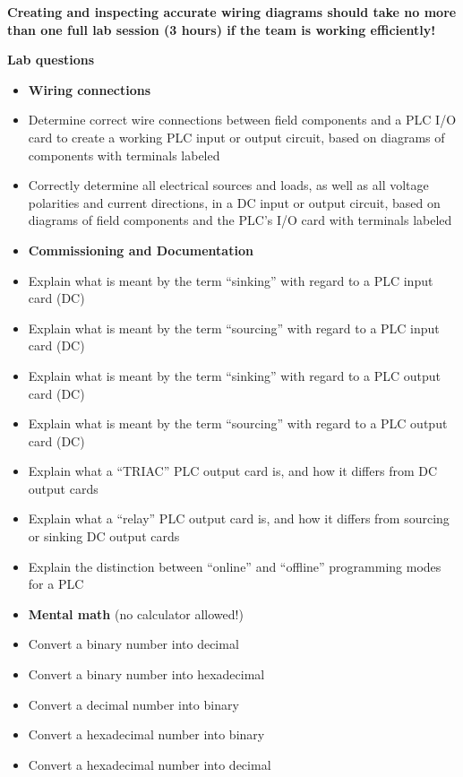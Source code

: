\vskip 10pt

{\bf Creating and inspecting accurate wiring diagrams should take no more than one full lab session (3 hours) if the team is working efficiently!}







\vfil \eject

\noindent
{\bf Lab questions}

\begin{itemize}
\item{} {\bf Wiring connections}
\item{} Determine correct wire connections between field components and a PLC I/O card to create a working PLC input or output circuit, based on diagrams of components with terminals labeled
\item{} Correctly determine all electrical sources and loads, as well as all voltage polarities and current directions, in a DC input or output circuit, based on diagrams of field components and the PLC's I/O card with terminals labeled
\end{itemize}

\filbreak

\begin{itemize}
\item{} {\bf Commissioning and Documentation}
\item{} Explain what is meant by the term ``sinking'' with regard to a PLC input card (DC)
\item{} Explain what is meant by the term ``sourcing'' with regard to a PLC input card (DC)
\item{} Explain what is meant by the term ``sinking'' with regard to a PLC output card (DC)
\item{} Explain what is meant by the term ``sourcing'' with regard to a PLC output card (DC)
\item{} Explain what a ``TRIAC'' PLC output card is, and how it differs from DC output cards
\item{} Explain what a ``relay'' PLC output card is, and how it differs from sourcing or sinking DC output cards
\item{} Explain the distinction between ``online'' and ``offline'' programming modes for a PLC
\end{itemize}

\filbreak

\begin{itemize}
\item{} {\bf Mental math} (no calculator allowed!)
\item{} Convert a binary number into decimal
\item{} Convert a binary number into hexadecimal
\item{} Convert a decimal number into binary
\item{} Convert a hexadecimal number into binary
\item{} Convert a hexadecimal number into decimal
\end{itemize}

